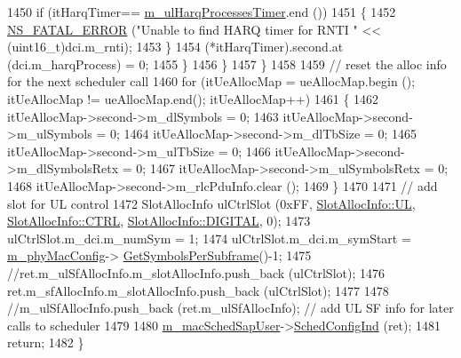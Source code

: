 \begin{DoxyCode}
1450                                 \textcolor{keywordflow}{if} (itHarqTimer== \hyperlink{classns3_1_1MmWaveFlexTtiMaxWeightMacScheduler_aa609a40ebf5eb905696d2db4e1443961}{m\_ulHarqProcessesTimer}.end ())
1451                                 \{
1452                                         \hyperlink{group__fatal_ga5131d5e3f75d7d4cbfd706ac456fdc85}{NS\_FATAL\_ERROR} (\textcolor{stringliteral}{"Unable to find HARQ timer for RNTI "}
       << (uint16\_t)dci.m\_rnti);
1453                                 \}
1454                                 (*itHarqTimer).second.at (dci.m\_harqProcess) = 0;
1455                         \}
1456                 \}
1457         \}
1458 
1459         \textcolor{comment}{// reset the alloc info for the next scheduler call}
1460         \textcolor{keywordflow}{for} (itUeAllocMap = ueAllocMap.begin (); itUeAllocMap != ueAllocMap.end(); itUeAllocMap++)
1461         \{
1462                 itUeAllocMap->second->m\_dlSymbols = 0;
1463                 itUeAllocMap->second->m\_ulSymbols = 0;
1464                 itUeAllocMap->second->m\_dlTbSize = 0;
1465                 itUeAllocMap->second->m\_ulTbSize = 0;
1466                 itUeAllocMap->second->m\_dlSymbolsRetx = 0;
1467                 itUeAllocMap->second->m\_ulSymbolsRetx = 0;
1468                 itUeAllocMap->second->m\_rlcPduInfo.clear ();
1469         \}
1470 
1471         \textcolor{comment}{// add slot for UL control}
1472         SlotAllocInfo ulCtrlSlot (0xFF, \hyperlink{structns3_1_1SlotAllocInfo_a6cad60db1d39034f1851e2cea625fe5da916b5be54594ead6ed677c570311cad2}{SlotAllocInfo::UL}, 
      \hyperlink{structns3_1_1SlotAllocInfo_a3ea7cb503bfd0c9a4df55a71b81b9331ad78b7d76ef82d56c33be1fa9c1867409}{SlotAllocInfo::CTRL}, \hyperlink{structns3_1_1SlotAllocInfo_adcbd067d82be6260b3399167d8f0b4eca47a67c342db658a08ded9ce4b49417ea}{SlotAllocInfo::DIGITAL}, 0);
1473         ulCtrlSlot.m\_dci.m\_numSym = 1;
1474         ulCtrlSlot.m\_dci.m\_symStart = \hyperlink{classns3_1_1MmWaveMacScheduler_a24d7af4971d2e500fe543cefbafa2fd9}{m\_phyMacConfig}->
      \hyperlink{classns3_1_1MmWavePhyMacCommon_a2fe835b76e3c689defa413e395cd10cb}{GetSymbolsPerSubframe}()-1;
1475         \textcolor{comment}{//ret.m\_ulSfAllocInfo.m\_slotAllocInfo.push\_back (ulCtrlSlot);}
1476         ret.m\_sfAllocInfo.m\_slotAllocInfo.push\_back (ulCtrlSlot);
1477 
1478         \textcolor{comment}{//m\_ulSfAllocInfo.push\_back (ret.m\_ulSfAllocInfo); // add UL SF info for later calls to scheduler}
1479 
1480         \hyperlink{classns3_1_1MmWaveFlexTtiMaxWeightMacScheduler_a4e443a317d7f5a4b2399043552cca5d5}{m\_macSchedSapUser}->\hyperlink{classns3_1_1MmWaveMacSchedSapUser_ac164dd52215c3924cf421b56089eece4}{SchedConfigInd} (ret);
1481         \textcolor{keywordflow}{return};
1482 \}
\end{DoxyCode}



